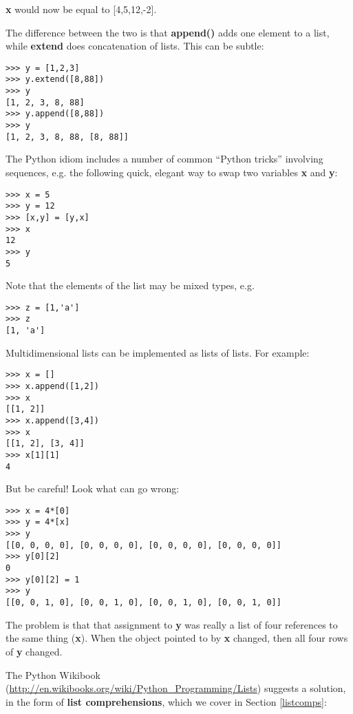 {\bf x} would now be equal to [4,5,12,-2].

The difference between the two is that {\bf append()} adds one element
to a list, while {\bf extend} does concatenation of lists.  This can be
subtle:

\begin{lstlisting}
>>> y = [1,2,3]
>>> y.extend([8,88])
>>> y
[1, 2, 3, 8, 88]
>>> y.append([8,88])
>>> y
[1, 2, 3, 8, 88, [8, 88]]
\end{lstlisting}

The Python idiom includes a number of common ``Python tricks'' involving
sequences, e.g.  the following quick, elegant way to swap two variables
{\bf x} and {\bf y}:

\begin{Verbatim}[fontsize=\relsize{-2}]
>>> x = 5
>>> y = 12
>>> [x,y] = [y,x]
>>> x
12
>>> y
5
\end{Verbatim}

Note that the elements of the list may be mixed types, e.g.

\begin{Verbatim}[fontsize=\relsize{-2}]
>>> z = [1,'a']
>>> z
[1, 'a']
\end{Verbatim}

Multidimensional lists can be implemented as lists of lists.  For
example:

\begin{Verbatim}[fontsize=\relsize{-2}]
>>> x = []
>>> x.append([1,2])
>>> x
[[1, 2]]
>>> x.append([3,4])
>>> x
[[1, 2], [3, 4]]
>>> x[1][1]
4
\end{Verbatim}

But be careful!  Look what can go wrong:

\begin{Verbatim}[fontsize=\relsize{-2}]
>>> x = 4*[0]
>>> y = 4*[x]
>>> y
[[0, 0, 0, 0], [0, 0, 0, 0], [0, 0, 0, 0], [0, 0, 0, 0]]
>>> y[0][2]
0
>>> y[0][2] = 1
>>> y
[[0, 0, 1, 0], [0, 0, 1, 0], [0, 0, 1, 0], [0, 0, 1, 0]]
\end{Verbatim}

The problem is that that assignment to {\bf y} was really a list of
four references to the same thing ({\bf x}).  When the object pointed to
by {\bf x} changed, then all four rows of {\bf y} changed.

The Python Wikibook
(\url{http://en.wikibooks.org/wiki/Python_Programming/Lists}) suggests a
solution, in the form of {\bf list comprehensions}, which we cover in
Section \ref{listcomps}:

